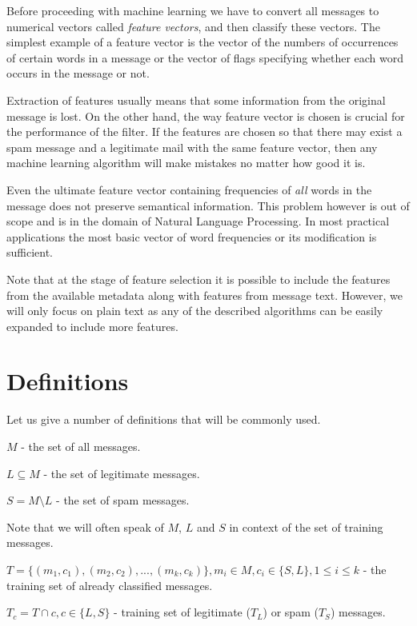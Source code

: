 \documentclass[12pt]{report}
\begin{document}
Before proceeding with machine learning we have to convert all messages to numerical vectors called \textit{feature vectors}, and then classify these vectors. The simplest example of a feature vector is the vector of the numbers of occurrences of certain words in a message or the vector of flags specifying whether each word occurs in the message or not.

Extraction of features usually means that some information from the original message is lost. On the other hand, the way feature vector is chosen is crucial for the performance of the filter. If the features are chosen so that there may exist a spam message and a legitimate mail with the same feature vector, then any machine learning algorithm will make mistakes no matter how good it is.

Even the ultimate feature vector containing frequencies of \textit{all} words in the message does not preserve semantical information. This problem however is out of scope and is in the domain of Natural Language Processing. In most practical applications the most basic vector of word frequencies or its modification is sufficient.

Note that at the stage of feature selection it is possible to include the features from the available metadata along with features from message text. However, we will only focus on plain text as any of the described algorithms can be easily expanded to include more features.

\newpage

\section{Definitions}

Let us give a number of definitions that will be commonly used.

$M$ - the set of all messages.

$L \subseteq M$ - the set of legitimate messages.

$S = M \setminus L$ - the set of spam messages.

Note that we will often speak of $M$, $L$ and $S$ in context of the set of training messages.

$T = \{(m_1, c_1), (m_2, c_2), ..., (m_k, c_k)\}, m_i \in M, c_i \in \{S, L\}, 1 \leq i \leq k$ - the training set of already classified messages.

$T_c = T \cap c, c \in \{L, S\}$ - training set of legitimate ($T_L$) or spam ($T_S$) messages.
\end{document}
